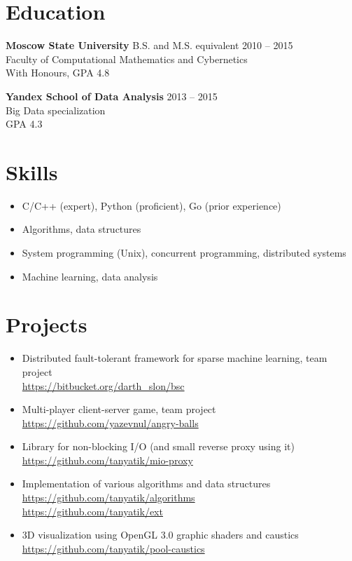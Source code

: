 \documentclass[margin]{res}
\begin{document}
\begin{resume}
\section{Education}
\textbf{Moscow State University} B.S. and M.S. equivalent \hfill 2010 -- 2015 \\
Faculty of Computational Mathematics and Cybernetics \\
With Honours, GPA 4.8

\textbf{Yandex School of Data Analysis} \hfill 2013 -- 2015 \\
Big Data specialization \\
GPA 4.3

\section{Skills}
\begin{itemize} \itemsep -2pt \topsep 0ex
\item C/C++ (expert), Python (proficient), Go (prior experience)
\item Algorithms, data structures
\item System programming (Unix), concurrent programming, distributed systems
\item Machine learning, data analysis
\end{itemize}

\section{Projects}
\begin{itemize} \itemsep -2pt \topsep 0ex
\item Distributed fault-tolerant framework for sparse machine learning, team project \\
\url{https://bitbucket.org/darth_slon/bsc}
\item Multi-player client-server game, team project \\
\url{https://github.com/yazevnul/angry-balls}
\item Library for non-blocking I/O (and small reverse proxy using it) \\
\url{https://github.com/tanyatik/mio-proxy}
\item Implementation of various algorithms and data structures \\
\url{https://github.com/tanyatik/algorithms} \\
\url{https://github.com/tanyatik/ext}
\item 3D visualization using OpenGL 3.0 graphic shaders and caustics \\
\url{https://github.com/tanyatik/pool-caustics}
\end{itemize}


%
\end{resume}
\end{document}
